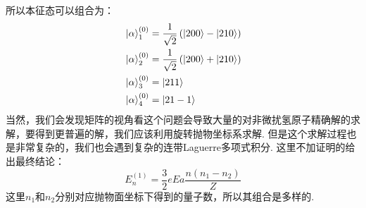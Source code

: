 所以本征态可以组合为：
\begin{align*}
& \ket{\alpha}_{1}^{(0)} = \frac{1}{\sqrt{2}}\left({\ket{200}-\ket{210}}\right) \\
& \ket{\alpha}_{2}^{(0)} = \frac{1}{\sqrt{2}}\left({\ket{200}+\ket{210}}\right) \\
& \ket{\alpha}_{3}^{(0)} = \ket{211} \\
& \ket{\alpha}_{4}^{(0)} = \ket{21-1}\\
\end{align*}
当然，我们会发现矩阵的视角看这个问题会导致大量的对非微扰氢原子精确解的求解，要得到更普遍的解，我们应该利用旋转抛物坐标系求解. 但是这个求解过程也是非常复杂的，我们也会遇到复杂的连带Laguerre多项式积分. 这里不加证明的给出最终结论：
\[
E_{n}^{(1)} = \frac{3}{2}eEa\frac{n(n_{1}-n_{2})}{Z}
\]
这里\(n_{1}\)和\(n_{2}\)分别对应抛物面坐标下得到的量子数，所以其组合是多样的. 

